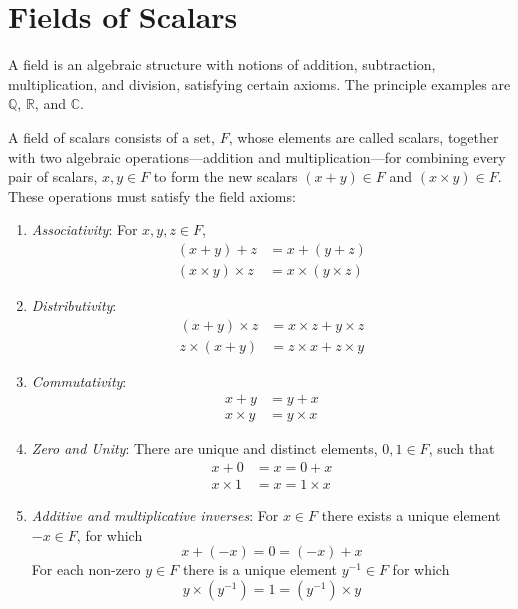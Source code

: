 
\section{Fields of Scalars}
\label{sec:scalarfields}

A field is an algebraic structure with notions of addition,
subtraction, multiplication, and division, satisfying certain
axioms. The principle examples are $\mathbb{Q}$, $\mathbb{R}$, and
$\mathbb{C}$.

 \begin{definition}
   A field of scalars consists of a set, $F$, whose elements are
   called scalars, together with two algebraic
   operations---addition and multiplication---for combining every
   pair of scalars, $x, y \in F$ to form the new scalars $(x+y) \in
   F$ and $(x \times y) \in F$.  These operations must satisfy the
  field axioms:
  \begin{enumerate}
  \item {\em Associativity}: For $x,y,z \in F$,
    \begin{align*}
      (x+y)+ z &= x+(y+z) \\
      (x\times y)\times z &= x \times (y \times z)
    \end{align*}
  \item {\em Distributivity}:
    \begin{align*}
      (x+y) \times z &= x \times z + y \times z \\
      z \times (x + y) &= z \times x + z \times y
    \end{align*}
  \item {\em Commutativity}:
    \begin{align*}
      x + y &= y + x \\
      x \times y &= y \times x
    \end{align*}
  \item {\em Zero and Unity}: There are unique and distinct
    elements, $0, 1 \in F$, such that
    \begin{align*}
      x+0 &= x = 0 + x \\
      x \times 1 &= x = 1 \times x
    \end{align*}
  \item {\em Additive and multiplicative inverses}: For $x \in F$
    there exists a unique element $-x \in F$, for which
    \[ x + (-x) = 0 = (-x)+x \] For each non-zero $y \in F$ there
    is a unique element $y^{-1} \in F$ for which \[ y \times
    (y^{-1}) = 1 = (y^{-1})\times y \]
  \end{enumerate}
 \end{definition}

